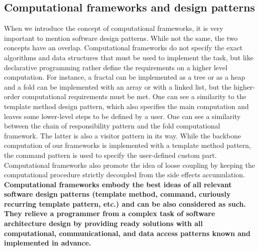 \subsection{Computational frameworks and design patterns}
\label{background_design_frameworks}
\quad When we introduce the concept of computational frameworks, it is very important to mention software design patterns. While not the same, the two concepts have an overlap. Computational frameworks do not specify the exact algorithms and data structures that must be used to implement the task, but like declarative programming rather define the requirements on a higher level computation. For instance, a fractal can be implemented as a tree or as a heap and a fold can be implemented with an array or with a linked list, but the higher-order computational requirements must be met. One can see a similarity to the template method design pattern, which also specifies the main computation and leaves some lower-level steps to be defined by a user. One can see a similarity between the chain of responsibility pattern and the fold computational framework. The latter is also a visitor pattern in its way. While the backbone computation of our frameworks is implemented with a template method pattern, the command pattern is used to specify the user-defined custom part. Computational frameworks also promote the idea of loose coupling by keeping the computational procedure strictly decoupled from the side effects accumulation.\newline\null
\textbf{\quad Computational frameworks embody the best ideas of all relevant software design patterns (template method, command, curiously recurring template pattern, etc.) and can be also considered as such. They relieve a programmer from a complex task of software architecture design by providing ready solutions with all computational, communicational, and data access patterns known and implemented in advance.}
